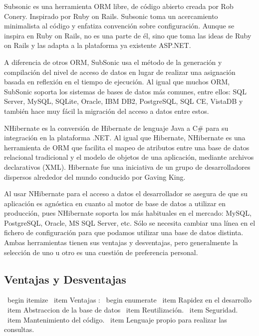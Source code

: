\documentclass[preprint,12pt]{elsarticle}
\begin{document}
Subsonic es una herramienta ORM libre, de código abierto creada por Rob Conery. Inspirado por Ruby on Rails. Subsonic toma un acercamiento minimalista al código y enfatiza convención sobre configuración. Aunque se inspira en Ruby on Rails, no es una parte de él, sino que toma las ideas de Ruby on Rails y las adapta a la plataforma ya existente ASP.NET.

A diferencia de otros ORM, SubSonic usa el método de la generación y compilación del nivel de acceso de datos en lugar de realizar una asignación basada en reflexión en el tiempo de ejecución. Al igual que muchos ORM, SubSonic soporta los sistemas de bases de datos más comunes, entre ellos: SQL Server, MySQL, SQLite, Oracle, IBM DB2, PostgreSQL, SQL CE, VistaDB y también hace muy fácil la migración del
acceso a datos entre estos.

NHibernate es la conversión de Hibernate de lenguaje Java a C# para su integración en la plataforma .NET. Al igual que Hibernate, NHibernate es una herramienta de ORM que facilita el mapeo de atributos entre una base de datos relacional tradicional y el modelo de objetos de una aplicación, mediante archivos declarativos (XML). Hibernate fue una iniciativa de un grupo de desarrolladores dispersos
alrededor del mundo conducido por Gaving King.

Al usar NHibernate para el acceso a datos el desarrollador se asegura de que su aplicación es agnóstica en cuanto al motor de base de datos a utilizar en producción, pues NHibernate soporta los más habituales en el mercado: MySQL, PostgreSQL, Oracle, MS SQL Server, etc. Sólo se necesita cambiar una línea en el fichero de configuración para que podamos utilizar una base de datos distinta. Ambas herramientas tienen sus ventajas y desventajas, pero generalmente la selección de uno u otro es una cuestión de preferencia personal.





\subsection{Ventajas y Desventajas}



\ begin { itemize }
\ item Ventajas :
\ begin { enumerate }
\ item Rapidez en el desarrollo 
\ item Abstraccion de la base de datos 
\ item Reutilización.
\ item Seguridad.
\ item Mantenimiento del código.
\ item Lenguaje propio para realizar las consultas.
\end{document}
